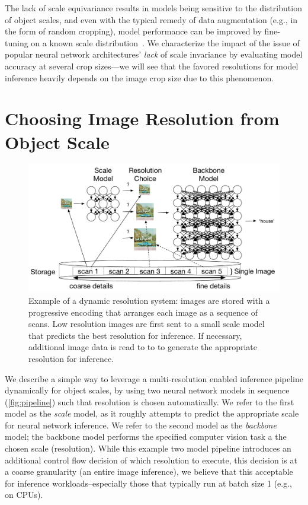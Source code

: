 The lack of scale equivariance results in models being sensitive to the distribution of object scales, and even with the typical remedy of data augmentation (e.g., in the form of random cropping), model performance can be improved by fine-tuning on a known scale distribution~\cite{touvron2019fixing}.
We characterize the impact of the issue of popular neural network architectures' \emph{lack} of scale invariance by evaluating model accuracy at several crop sizes---we will see that the favored resolutions for model inference heavily depends on the image crop size due to this phenomenon.


\section{Choosing Image Resolution from Object Scale}
\begin{figure}
    \centering
    \includegraphics[width=\textwidth]{e2e_diagrams/overview figure.pdf}
    \caption{Example of a dynamic resolution system: images are stored with a progressive encoding that arranges each image as a sequence of scans. Low resolution images are first sent to a small scale model that predicts the best resolution for inference. If necessary, additional image data is read to to to generate the appropriate resolution for inference. }
    \label{fig:pipeline}
\end{figure}
We describe a simple way to leverage a multi-resolution enabled inference pipeline dynamically for object scales, by using two neural network models in sequence (\autoref{fig:pipeline}) such that resolution is chosen automatically.
We refer to the first model as the \emph{scale} model, as it roughly attempts to predict the appropriate scale for neural network inference.
We refer to the second model as the \emph{backbone} model; the backbone model performs the specified computer vision task a the chosen scale (resolution).
While this example two model pipeline introduces an additional control flow decision of which resolution to execute, this decision is at a coarse granularity (an entire image inference), we believe that this acceptable for inference workloads--especially those that typically run at batch size 1 (e.g., on CPUs).

